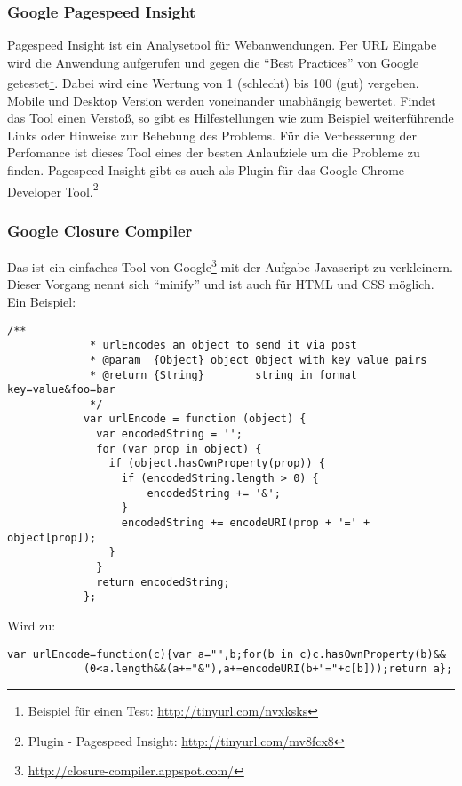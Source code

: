 		\subsubsection{Google Pagespeed Insight} %
		\label{ssub:google_pagespeed_insight}
			Pagespeed Insight ist ein Analysetool für Webanwendungen. Per URL Eingabe wird die Anwendung aufgerufen und gegen die "`Best Practices"' von Google getestet\footnote{Beispiel für einen Test: \url{http://tinyurl.com/nvxksks}}. Dabei wird eine Wertung von 1 (schlecht) bis 100 (gut) vergeben. Mobile und Desktop Version werden voneinander unabhängig bewertet. Findet das Tool einen Verstoß, so gibt es Hilfestellungen wie zum Beispiel weiterführende Links oder Hinweise zur Behebung des Problems. Für die Verbesserung der Perfomance ist dieses Tool eines der besten Anlaufziele um die Probleme zu finden. Pagespeed Insight gibt es auch als Plugin für das Google Chrome Developer Tool.\footnote{Plugin - Pagespeed Insight: \url{http://tinyurl.com/mv8fcx8}}
		

		\subsubsection{Google Closure Compiler} %
		\label{ssub:closure_compiler}
			Das ist ein einfaches Tool von Google\footnote{\url{http://closure-compiler.appspot.com/}} mit der Aufgabe Javascript zu verkleinern. Dieser Vorgang nennt sich "`minify"' und ist auch für HTML und CSS möglich. Ein Beispiel:

			\begin{lstlisting}[captionpos=t, caption=Input, label=lst:minifyInput]
			/**
			 * urlEncodes an object to send it via post
			 * @param  {Object} object Object with key value pairs
			 * @return {String}        string in format key=value&foo=bar
			 */
			var urlEncode = function (object) {
			  var encodedString = '';
			  for (var prop in object) {
			    if (object.hasOwnProperty(prop)) {
			      if (encodedString.length > 0) {
			          encodedString += '&';
			      }
			      encodedString += encodeURI(prop + '=' + object[prop]);
			    }
			  }
			  return encodedString;
			};
			\end{lstlisting}

			Wird zu:

			\begin{lstlisting}[captionpos=t, caption=Output, label=lst:minifyOutput, breaklines=false]
			var urlEncode=function(c){var a="",b;for(b in c)c.hasOwnProperty(b)&&
			(0<a.length&&(a+="&"),a+=encodeURI(b+"="+c[b]));return a};
			\end{lstlisting}


